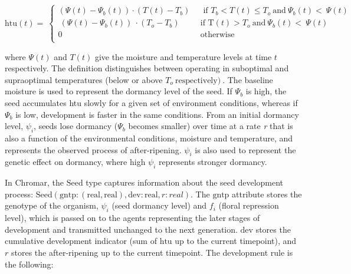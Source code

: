 \documentclass[phd]{infthesis}
\begin{document}
\[\text{htu}\left( t \right) = \ \left\{ \begin{matrix}
\left( \Psi\left( t \right) - \Psi_{b}\left( t \right) \right) \cdot \left( T\left( t \right) - T_{b} \right) \\
\ \left( \Psi\left( t \right) - \Psi_{b}\left( t \right) \right)\  \cdot \left( T_{o} - T_{b} \right) \\
0 \\
\end{matrix} \right.\ \ \begin{matrix}
\text{\ \ if\ \ }T_{b} < T\left( t \right) \leq T_{o}\ \text{and}\ \Psi_{b}\left( t \right) < \ \Psi(t) \\
\text{if\ \ T}\left( t \right) > T_{o}\ \text{and}\ \Psi_{b}\left( t \right) < \ \Psi\left( t \right) \\
\text{otherwise} \\
\end{matrix}\]

where \(\Psi(t)\) and \(T(t)\) give the moisture and temperature levels
at time \(t\) respectively. The definition distinguishes between
operating in suboptimal and supraoptimal temperatures (below or above
\(T_{o}\ \text{respectively})\ \). The baseline moisture is used to
represent the dormancy level of the seed. If \(\Psi_{b}\) is high, the
seed accumulates htu slowly for a given set of environment conditions,
whereas if \(\Psi_{b}\) is low, development is faster in the same
conditions. From an initial dormancy level, \(\psi_{i}\), seeds lose
dormancy (\(\Psi_{b}\) becomes smaller) over time at a rate \emph{r}
that is also a function of the environmental conditions, moisture and
temperature, and represents the observed process of after-ripening.
\(\psi_{i}\) is also used to represent the genetic effect on dormancy,
where high \(\psi_{i}\) represents stronger dormancy.

In Chromar, the \(\text{Seed}\) type captures information about the seed
development process:
\(\text{Seed}(\text{gntp}:(\text{real},\text{real}),\text{dev}:\text{real},r:real)\).
The \(\text{gntp}\) attribute stores the genotype of the organism,
\(\psi_{i}\) (seed dormancy level) and \(f_{i}\) (floral repression
level), which is passed on to the agents representing the later stages
of development and transmitted unchanged to the next generation.
\(\text{dev}\) stores the cumulative development indicator (sum of
\(\text{htu}\) up to the current timepoint), and \(r\) stores the
after-ripening up to the current timepoint. The development rule is the
following:
\end{document}
